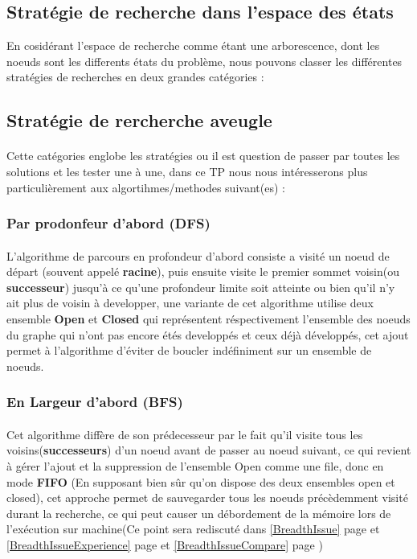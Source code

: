 \subsection{Stratégie de recherche dans l'espace des états}
En cosidérant l'espace de recherche comme étant une arborescence, dont les noeuds sont les differents états du problème, nous pouvons classer les différentes stratégies de recherches en deux grandes catégories :
\subsection{Stratégie de rercherche aveugle}
\paragraph{}Cette catégories englobe les stratégies ou il est question de passer par toutes les solutions et les tester une à une, dans ce TP nous nous intéresserons plus particulièrement aux algortihmes/methodes suivant(es) :  
\subsubsection{Par prodonfeur d'abord (DFS)}
\paragraph{}
L'algorithme de parcours en profondeur d'abord consiste a visité un noeud de départ (souvent appelé \textbf{racine}), puis ensuite visite le premier sommet voisin(ou \textbf{successeur}) jusqu'à ce qu'une profondeur limite soit atteinte ou bien qu'il n'y ait plus de voisin à developper, une variante de cet algorithme utilise deux ensemble \textbf{Open} et \textbf{Closed} qui représentent réspectivement l'ensemble des noeuds du graphe qui n'ont pas encore étés developpés et ceux déjà développés, cet ajout permet à l'algorithme d'éviter de boucler indéfiniment sur un ensemble de noeuds.
\subsubsection{En Largeur d'abord (BFS)}
\paragraph{}
Cet algorithme diffère de son prédecesseur par le fait qu'il visite tous les voisins(\textbf{successeurs}) d'un noeud avant de passer au noeud suivant, ce qui revient à gérer l'ajout et la suppression de l'ensemble Open comme une file, donc en mode \textbf{FIFO} (En supposant bien sûr qu'on dispose des deux ensembles open et closed), cet approche permet de sauvegarder tous les noeuds précèdemment visité durant la recherche, ce qui peut causer un débordement de la mémoire lors de l'exécution sur machine(Ce point sera rediscuté dans \ref{BreadthIssue} page \pageref{BreadthIssue} et \ref{BreadthIssueExperience} page \pageref{BreadthIssueExperience} et \ref{BreadthIssueCompare} page \pageref{BreadthIssueCompare})

